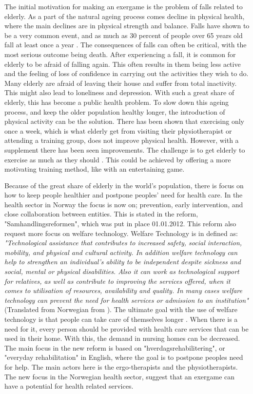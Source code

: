 The initial motivation for making an exergame is the problem of falls related to elderly. As a part of the natural ageing process comes decline in physical health, where the main declines are in physical strength and balance. Falls have shown to be a very common event, and as much as 30 percent of people over 65 years old fall at least once a year \cite{otago}. The consequences of falls can often be critical, with the most serious outcome being death. After experiencing a fall, it is common for elderly to be afraid of falling again. This often results in them being less active and the feeling of loss of confidence in carrying out the activities they wish to do. Many elderly are afraid of leaving their house and suffer from total inactivity. This might also lead to loneliness and depression. With such a great share of elderly, this has become a public health problem. To slow down this ageing process, and keep the older population healthy longer, the introduction of physical activity can be the solution. There has been shown that exercising only once a week, which is what elderly get from visiting their physiotherapist or attending a training group, does not improve physical health. However, with a supplement there has been seen improvements. The challenge is to get elderly to exercise as much as they should \cite{statistikknorge12}. This could be achieved by offering a more motivating training method, like with an entertaining game.

Because of the great share of elderly in the world's population, there is focus on how to keep people healthier and postpone peoples' need for health care.  In the health sector in Norway the focus is now on; prevention, early intervention, and close collaboration between entities. This is stated in the reform, "Samhandlingsreformen", which was put in place 01.01.2012. This reform also request more focus on welfare technology. Welfare Technology is in \cite{welfare} defined as: \emph{"Technological assistance that contributes to increased safety, social interaction, mobility, and physical and cultural activity. In addition welfare technology can help to strengthen an individual's ability to be independent despite sickness and social, mental or physical disabilities. Also it can work as technological support for relatives, as well as contribute to improving the services offered, when it comes to utilisation of resources, availability and quality. In many cases welfare technology can prevent the need for health services or admission to an institution"} (Translated from Norwegian from \cite{welfare}). The ultimate goal with the use of welfare technology is that people can take care of themselves longer \cite{regjering}. When there is a need for it, every person should be provided with health care services that can be used in their home. With this, the demand in nursing homes can be decreased. The main focus in the new reform is based on "hverdagsrehabilitering", or "everyday rehabilitation" in English, where the goal is to postpone peoples need for help. The main actors here is the ergo-therapists and the physiotherapists. The new focus in the Norwegian health sector, suggest that an exergame can have a potential for health related services.

